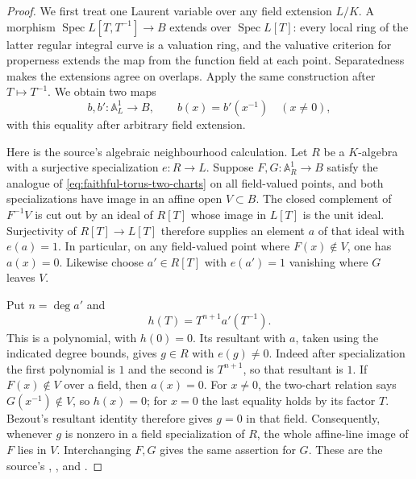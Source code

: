 \begin{proof}
We first treat one Laurent variable over any field extension
\(L/K\).  A morphism
\(\operatorname{Spec}L[T,T^{-1}]\to B\) extends over
\(\operatorname{Spec}L[T]\): every local ring of the latter
regular integral curve is a valuation ring, and the valuative
criterion for properness extends the map from the function
field at each point.  Separatedness makes the extensions agree
on overlaps.  Apply the same construction after \(T\mapsto T^{-1}\).
We obtain two maps
\[
        b,b':\mathbb A^1_L\longrightarrow B,\qquad
                         b(x)=b'(x^{-1})\quad(x\ne0),
 \tag{TP1}\label{eq:faithful-torus-two-charts}
\]
with this equality after arbitrary field extension.

Here is the source's algebraic neighbourhood calculation.
Let \(R\) be a \(K\)-algebra with a surjective specialization
\(e:R\to L\).
Suppose \(F,G:\mathbb A^1_R\to B\) satisfy the analogue of
\eqref{eq:faithful-torus-two-charts} on all field-valued points,
and both specializations have image in an affine open
\(V\subset B\).
The closed complement of \(F^{-1}V\) is cut out by an ideal of
\(R[T]\) whose image in \(L[T]\) is the unit ideal.
Surjectivity of \(R[T]\to L[T]\) therefore supplies an element
\(a\) of that ideal with \(e(a)=1\).
In particular, on any field-valued point where \(F(x)\notin V\),
one has \(a(x)=0\).
Likewise choose \(a'\in R[T]\) with \(e(a')=1\) vanishing where
\(G\) leaves \(V\).

Put \(n=\deg a'\) and
\[
                  h(T)=T^{n+1}a'(T^{-1}).
\]
This is a polynomial, with \(h(0)=0\).
Its resultant with \(a\), taken using the indicated degree
bounds, gives \(g\in R\) with \(e(g)\ne0\).
Indeed after specialization the first polynomial is \(1\)
and the second is \(T^{n+1}\), so that resultant is \(1\).
If \(F(x)\notin V\) over a field, then \(a(x)=0\).
For \(x\ne0\), the two-chart relation says
\(G(x^{-1})\notin V\), so \(h(x)=0\); for \(x=0\) the last
equality holds by its factor \(T\).
Bezout's resultant identity therefore gives \(g=0\) in that
field.  Consequently, whenever \(g\) is nonzero in a field
specialization of \(R\), the whole affine-line image of \(F\)
lies in \(V\).  Interchanging \(F,G\) gives the same assertion
for \(G\).  These are the source's
, , and
.


\end{proof}
